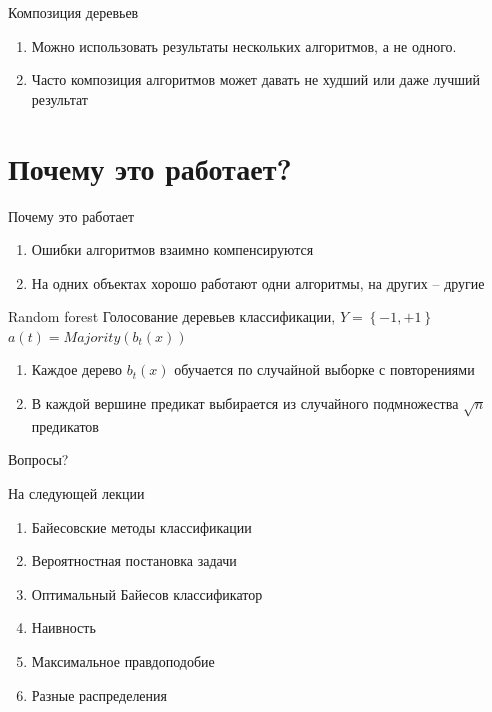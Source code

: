 \documentclass[10pt]{beamer}
\begin{document}
\begin{frame}{Композиция деревьев}
	\begin{enumerate} [--]
		\item Можно использовать результаты нескольких	алгоритмов, а не одного.
		\item Часто композиция алгоритмов может давать не худший или даже лучший результат
  \end{enumerate}
\end{frame}

\section{Почему это работает?}

\begin{frame}{Почему это работает}
	\begin{enumerate} [--]
		\item Ошибки алгоритмов взаимно компенсируются	
		\item На одних объектах хорошо работают одни алгоритмы, на других -- другие	
	\end{enumerate}
\end{frame}

\begin{frame}{Random forest}
	Голосование деревьев классификации, $Y = \left\{ -1, +1 \right\}$\\
	$a(t) = Majority(b_t(x))$%
	\begin{enumerate}[--]
  	  \item Каждое дерево $b_t(x)$ обучается по случайной выборке с повторениями
	  \item В каждой вершине предикат выбирается из случайного подмножества $\sqrt{n}$ предикатов
	\end{enumerate}
\end{frame}

\begin{frame}[standout]
  Вопросы?
\end{frame}

\appendix

\begin{frame}{На следующей лекции}
  	\begin{enumerate} [--]
		\item Байесовские методы классификации
		\item Вероятностная постановка задачи
		\item Оптимальный Байесов классификатор
		\item Наивность
		\item Максимальное правдоподобие
		\item Разные распределения
	\end{enumerate}
\end{frame}
\end{document}
